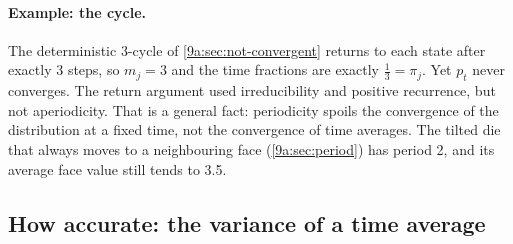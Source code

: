 \paragraph{Example: the cycle.}
The deterministic 3-cycle of \cref{9a:sec:not-convergent} returns to each state after exactly 3
steps, so $m_j=3$ and the time fractions are exactly $\tfrac13=\pi_j$. Yet $p_t$ never
converges. The return argument used irreducibility and positive recurrence, but not
aperiodicity. That is a general fact: periodicity spoils the convergence of the distribution at
a fixed time, not the convergence of time averages. The tilted die that always moves to a
neighbouring face (\cref{9a:sec:period}) has period 2, and its average face value still tends to
3.5.

\subsection{How accurate: the variance of a time average}
\label{9a:sec:time-average-variance}

